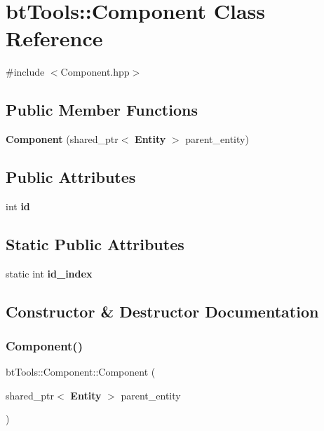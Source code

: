 \section{bt\+Tools\+::Component Class Reference}
\label{classbt_tools_1_1_component}


{\ttfamily \#include $<$Component.\+hpp$>$}

\subsection*{Public Member Functions}
\begin{DoxyCompactItemize}
\item 
\textbf{ Component} (shared\+\_\+ptr$<$ \textbf{ Entity} $>$ parent\+\_\+entity)
\end{DoxyCompactItemize}
\subsection*{Public Attributes}
\begin{DoxyCompactItemize}
\item 
int \textbf{ id}
\end{DoxyCompactItemize}
\subsection*{Static Public Attributes}
\begin{DoxyCompactItemize}
\item 
static int \textbf{ id\+\_\+index}
\end{DoxyCompactItemize}


\subsection{Constructor \& Destructor Documentation}
\mbox{\label{classbt_tools_1_1_component_adba0ce392dad3d245f401700b49218d8}} 
\subsubsection{Component()}
{\footnotesize\ttfamily bt\+Tools\+::\+Component\+::\+Component (\begin{DoxyParamCaption}\item[{shared\+\_\+ptr$<$ \textbf{ Entity} $>$}]{parent\+\_\+entity }\end{DoxyParamCaption})\hspace{0.3cm}{\ttfamily [inline]}}



